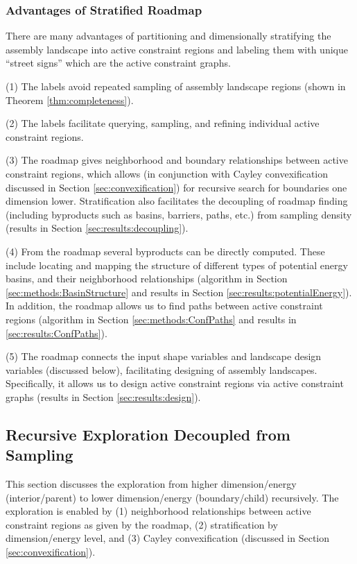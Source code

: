 \documentclass[]{article}
\begin{document}
\subsubsection{Advantages of Stratified Roadmap}
\label{sec:AdvantagesStratification}
There are many advantages of partitioning and dimensionally stratifying the
assembly landscape into active constraint regions and labeling them with unique
``street signs'' which are the active constraint graphs. 

(1) The labels avoid repeated sampling of assembly landscape regions
(shown in Theorem \ref{thm:completeness}). 

(2) The labels facilitate querying, sampling, and refining individual active
constraint regions.

(3) The roadmap gives neighborhood and boundary relationships between active
constraint regions, which allows (in conjunction with Cayley convexification
discussed in Section \ref{sec:convexification}) for recursive search for
boundaries one dimension lower. Stratification also facilitates the decoupling of
roadmap finding (including byproducts such as basins, barriers, paths, etc.)
from sampling density (results in Section \ref{sec:results:decoupling}).

(4) From the roadmap several byproducts can be directly computed. These
include locating and mapping the structure of different types of potential
energy basins, and their neighborhood relationships (algorithm in Section
\ref{sec:methods:BasinStructure} and results in Section
\ref{sec:results:potentialEnergy}). In addition, the roadmap allows us to find
paths between active constraint regions (algorithm in Section
\ref{sec:methods:ConfPaths} and results in \ref{sec:results:ConfPaths}).

(5) The roadmap connects the input shape variables and landscape design variables
(discussed below), facilitating designing of assembly landscapes. Specifically,
it allows us to design active constraint regions via active constraint graphs
(results in Section \ref{sec:results:design}). 


\subsection{Recursive Exploration Decoupled from Sampling}
\label{sec:recursiveBoundarySearch}
This section discusses the exploration from
higher dimension/energy (interior/parent) to lower dimension/energy
(boundary/child) recursively. The exploration is enabled by
(1) neighborhood relationships between active constraint regions as given by the
roadmap, (2) stratification by dimension/energy level, and (3) Cayley convexification
(discussed in Section \ref{sec:convexification}).
\end{document}
